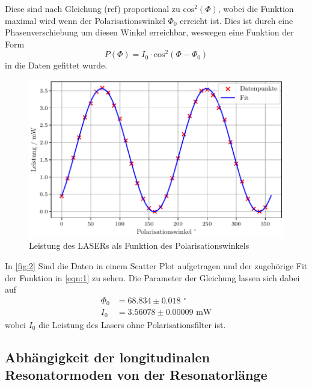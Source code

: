 \noindent 
Diese sind nach Gleichung (ref) proportional zu $\text{cos}^2\left(\Phi\right)$, wobei die Funktion maximal wird wenn der Polarisationswinkel $\Phi_0$ erreicht ist. Dies ist durch eine Phasenverschiebung um diesen Winkel erreichbar, weswegen eine Funktion der Form 
\begin{equation}
  \label{eqn:1}
  P\left(\Phi\right) = I_0 \cdot \text{cos}^2\left(\Phi - \Phi_0\right)
\end{equation}
in die Daten gefittet wurde.
\begin{figure}[H]
  \centering
  \includegraphics[width=0.7\linewidth]{plots/pol.pdf}
  \caption{Leistung des LASERs als Funktion des Polarisationswinkels}
  \label{fig:2}
\end{figure}
\noindent
In \autoref{fig:2} Sind die Daten in einem Scatter Plot aufgetragen und der zugehörige Fit der Funktion in \autoref{eqn:1} zu sehen.
Die Parameter der Gleichung lassen sich dabei auf 
\begin{align}
  \Phi_0 &= 68.834 \pm 0.018 \, \, ^\circ \\
  I_0 &= 3.56078 \pm 0.00009 \, \, \mathrm{mW}
\end{align}
wobei $I_0$ die Leistung des Lasers ohne Polarisationsfilter ist. 
\noindent
\newpage 
\subsection{Abhängigkeit der longitudinalen Resonatormoden von der Resonatorlänge}
\newpage